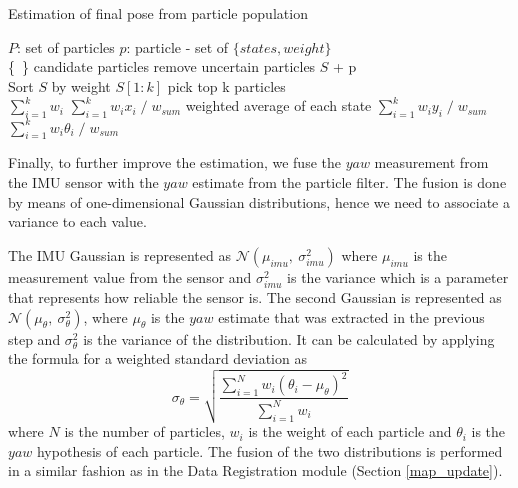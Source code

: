 \begin{algorithm}
    \caption{Estimation of final pose from particle population}
    \label{alg:pf_estimation}
    \begin{algorithmic}[1]
        \State $P$: set of particles
        \State $p$: particle - set of $\{states, weight\}$ \\

         {\{\ \}}
        \Comment candidate particles
                \Comment remove uncertain particles
                 {$S$ + p}
            \EndIf
        \EndFor \\

        \State Sort $S$ by weight
         {$S[1:k]$}
        \Comment pick top k particles \\

         {$\sum^k_{i=1} w_i$}
         {$\sum^k_{i=1} w_i x_i \; / \; w_{sum}$}
        \Comment weighted average of each state
         {$\sum^k_{i=1} w_i y_i \; / \; w_{sum}$}
        \Let {$\theta$} {$\sum^k_{i=1} w_i \theta_i \; / \; w_{sum}$}
    \end{algorithmic}
\end{algorithm}

Finally, to further improve the estimation, we fuse the $yaw$ measurement from
the IMU sensor with the $yaw$ estimate from the particle filter.
The fusion is done by means of one-dimensional Gaussian distributions,
hence we need to associate a variance to each value.

The IMU Gaussian is represented as $\mathcal{N}(\mu_{imu} ,\ \sigma^2_{imu})$
where $\mu_{imu}$ is the measurement value from the sensor and
$\sigma^2_{imu}$ is the variance which is a parameter that represents how
reliable the sensor is.
The second Gaussian is represented as
$\mathcal{N}(\mu_{\theta} ,\ \sigma^2_{\theta})$,
where $\mu_{\theta}$ is the $yaw$ estimate that was extracted in the
previous step and $\sigma^2_{\theta}$ is the variance of the distribution.
It can be calculated by applying the formula for a weighted standard
deviation as
\begin{equation}
    \sigma_\theta = \sqrt{\frac
    {\sum\limits^{N}_{i=1} w_i (\theta_i - \mu_\theta)^2}
    {\sum\limits^{N}_{i=1} w_i}}
\end{equation}
where
$N$ is the number of particles,
$w_i$ is the weight of each particle and
$\theta_i$ is the $yaw$ hypothesis of each particle.
The fusion of the two distributions is performed in a similar fashion as
in the Data Registration module (Section \ref{map_update}).

